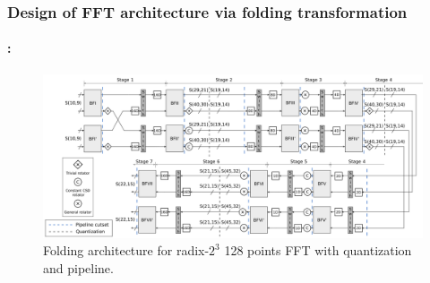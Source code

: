 \begin{frame}
	\frametitle{\textbf{Design of FFT architecture via folding transformation}}
	\framesubtitle{\secname : \subsecname}
	\vspace{-0.5cm}
		\begin{figure}[h!] \centering
		   	\includegraphics[width=0.95\paperwidth]{./image/folding-128-quant-pipe.png}
		   	\caption{ \tiny Folding architecture for radix-$2^3$ 128 points FFT with quantization and pipeline.}
		\end{figure}  	
\end{frame}